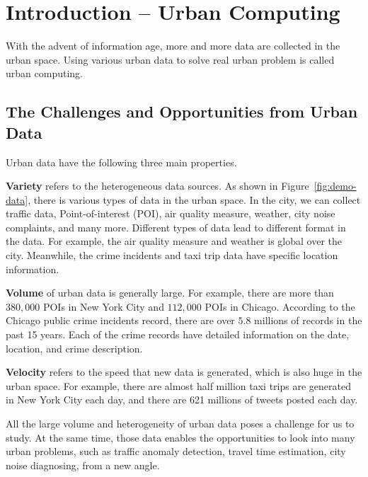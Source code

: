 \chapter{Introduction -- Urban Computing} \label{chapter1:introduction}



With the advent of information age, more and more data are collected in the urban space. Using various urban data to solve real urban problem is called urban computing.



\section{The Challenges and Opportunities from Urban Data}


Urban data have the following three main properties. 

\textbf{Variety} refers to the heterogeneous data sources. As shown in Figure~\ref{fig:demo-data}, there is various types of data in the urban space. In the city, we can collect traffic data, Point-of-interest (POI), air quality measure, weather,  city noise complaints, and many more. Different types of data lead to different format in the data. For example, the air quality measure and weather is global over the city. Meanwhile, the crime incidents and taxi trip data have specific location information.


\textbf{Volume} of urban data is generally large. For example, there are more than $380,000$ POIs in New York City and $112,000$ POIs in Chicago. According to the Chicago public crime incidents record, there are over $5.8$ millions of records in the past 15 years. Each of the crime records have detailed information on the date, location, and crime description. 


\textbf{Velocity} refers to the speed that new data is generated, which is also huge in the urban space. For example, there are almost half million taxi trips are generated in New York City each day, and there are 621 millions of tweets posted each day.


All the large volume and heterogeneity of urban data poses a challenge for us to study. At the same time, those data enables the opportunities to look into many urban problems, such as traffic anomaly detection,  travel time estimation, city noise diagnosing, from a new angle.


